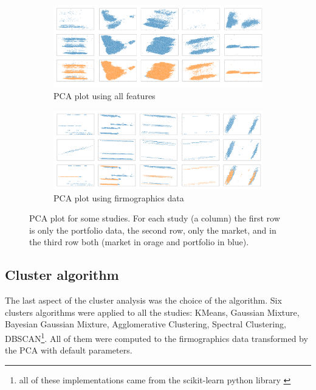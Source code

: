 \begin{figure}[h]
    \begin{subfigure}{\linewidth}
        \centering
        \includegraphics[width=.9\linewidth]{fig/ch3-pca-plot-all-features.png}
        \caption{PCA plot using all features}
        \label{fig:pca-plot:all-features}
    \end{subfigure}
    \begin{subfigure}{\linewidth}
        \centering
        \includegraphics[width=.9\linewidth]{fig/ch3-pca-plot-firmographics.png}
        \caption{PCA plot using firmographics data}
        \label{fig:pca-plot:firmographics}
    \end{subfigure}
    \caption{PCA plot for some studies. For each study (a column) the first row is only the portfolio data, the second row, only the market, and in the third row both (market in orage and portfolio in blue).}
    \label{fig:pca-plot}
\end{figure}

\subsection{Cluster algorithm}
\label{ch:cluster-algorithm}

The last aspect of the cluster analysis was the choice of the algorithm. Six clusters algorithms were applied to all the studies: KMeans, Gaussian Mixture, Bayesian Gaussian Mixture, Agglomerative Clustering, Spectral Clustering, DBSCAN\footnote{all of these implementations came from the scikit-learn python library \cite{scikit-learn}}. All of them were computed to the firmographics data transformed by the PCA with default parameters.


